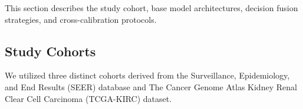 This section describes the study cohort, base model architectures, decision fusion strategies, and cross-calibration protocols.

\subsection{Study Cohorts}
We utilized three distinct cohorts derived from the Surveillance, Epidemiology, and End Results (SEER) database and The Cancer Genome Atlas Kidney Renal Clear Cell Carcinoma (TCGA-KIRC) dataset.
